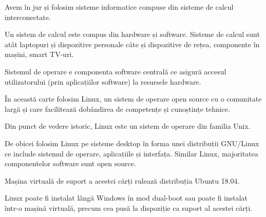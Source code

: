 Avem în jur și folosim sisteme informatice compuse din sisteme de calcul interconectate.

Un sistem de calcul este compus din hardware și software.
Sisteme de calcul sunt atât laptopuri și dispozitive personale câte și dispozitive de rețea, componente în mașini, smart TV-uri.

Sistemul de operare e componenta software centrală ce asigură accesul utilizatorului (prin aplicațiilor software) la resursele hardware.

În această carte folosim Linux, un sistem de operare open source cu o comunitate largă și care facilitează dobândirea de competențe și cunoștințe tehnice.

Din punct de vedere istoric, Linux este un sistem de operare din familia Unix.

De obicei folosim Linux pe sisteme desktop în forma unei distribuții GNU/Linux ce include sistemul de operare, aplicațiile și interfața.
Similar Linux, majoritatea componentelor software sunt open source.

Mașina virtuală de suport a acestei cărți rulează distribuția Ubuntu 18.04.

Linux poate fi instalat lângă Windows în mod dual-boot sau poate fi instalat într-o mașină virtuală, precum cea pusă la dispoziție ca suport al acestei cărți.

